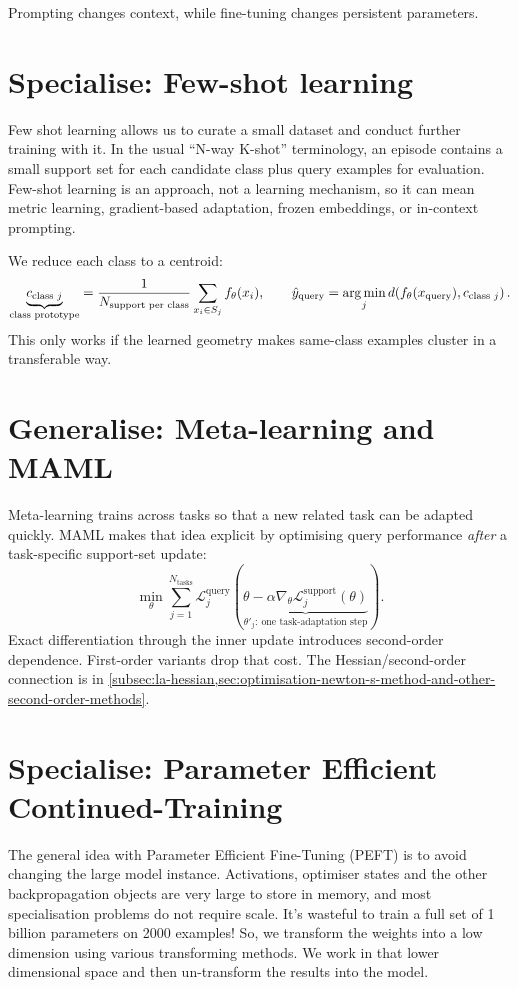 \begin{calloutmemoryhook}
    Prompting changes context, while fine-tuning changes persistent parameters.
\end{calloutmemoryhook}


\section{Specialise: Few-shot learning}
\label{sec:adaptation-few-shot-learning-learn-from-very-few-examples}
Few shot learning allows us to curate a small dataset and conduct further training with it.
In the usual ``N-way K-shot'' terminology, an episode contains a small support set for each candidate class plus query examples for evaluation.
Few-shot learning is an approach, not a learning mechanism, so it can mean metric learning, gradient-based adaptation, frozen embeddings, or in-context prompting.

We reduce each class to a centroid:
\[
    \underbrace{c_{\text{class }j}}_{\text{class prototype}}
    =
    \frac{1}{N_{\text{support per class}}}
    \sum_{x_i\in S_j}f_\theta(x_i),
    \qquad
    \hat y_{\text{query}}
    =
    \operatorname*{arg\,min}_j d\!\left(f_\theta(x_{\text{query}}),c_{\text{class }j}\right).
\]
This only works if the learned geometry makes same-class examples cluster in a transferable way.

\section{Generalise: Meta-learning and MAML}
\label{sec:adaptation-meta-learning-and-maml}
Meta-learning trains across tasks so that a new related task can be adapted quickly.
MAML makes that idea explicit by optimising query performance \emph{after} a task-specific support-set update:
\[
    \min_\theta
    \sum_{j=1}^{N_{\text{tasks}}}
    \mathcal L^{\text{query}}_j\!\left(
    \underbrace{
    \theta-\alpha\nabla_\theta\mathcal L^{\text{support}}_j(\theta)
    }_{\theta'_j:\ \text{one task-adaptation step}}
    \right).
\]
Exact differentiation through the inner update introduces second-order dependence.
First-order variants drop that cost.
The Hessian/second-order connection is in \cref{subsec:la-hessian,sec:optimisation-newton-s-method-and-other-second-order-methods}.



\section{Specialise: Parameter Efficient Continued-Training}
The general idea with Parameter Efficient Fine-Tuning (PEFT) is to avoid changing the large model instance.
Activations, optimiser states and the other backpropagation objects are very large to store in memory, and most specialisation problems do not require scale.
It's wasteful to train a full set of 1 billion parameters on 2000 examples!
So, we transform the weights into a low dimension using various transforming methods. 
We work in that lower dimensional space and then un-transform the results into the model.

